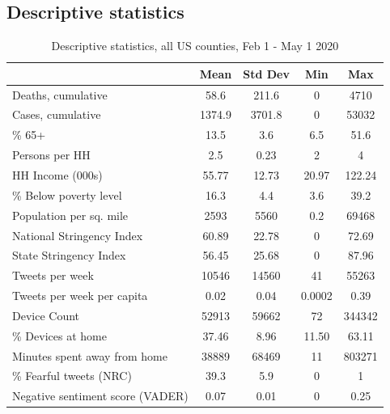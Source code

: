 \documentclass{article}
\begin{document}
\subsection{Descriptive statistics}\label{descrip}
\begin{singlespace}
    \begin{table}[!htb]
    \centering  
  \caption{Descriptive statistics, all US counties, Feb 1 - May 1 2020}
    \begin{tabular}{lcccc}
      \toprule
       & Mean & Std Dev & Min & Max\\
      \midrule
      
      Deaths, cumulative & 58.6 & 211.6 & 0 & 4710\\
      Cases, cumulative & 1374.9 & 3701.8 & 0 & 53032\\
      \midrule
      \% 65+ & 13.5 & 3.6 & 6.5 & 51.6\\
    Persons per HH & 2.5 & 0.23 & 2 & 4\\
    HH Income (000s) & 55.77 & 12.73 & 20.97 & 122.24\\
    \% Below poverty level & 16.3 & 4.4 & 3.6 & 39.2\\
    Population per sq. mile & 2593 & 5560 & 0.2 & 69468\\
    \midrule
    National Stringency Index & 60.89 & 22.78 & 0 & 72.69\\
    State Stringency Index & 56.45 & 25.68 & 0 & 87.96\\
    \midrule
    Tweets per week & 10546 & 14560 & 41 & 55263\\
    Tweets per week per capita & 0.02 & 0.04 & 0.0002 & 0.39\\
    \midrule
    Device Count & 52913 & 59662 & 72 & 344342\\
    \% Devices at home & 37.46 & 8.96 & 11.50 & 63.11\\
    Minutes spent away from home & 38889 & 68469 & 11 & 803271\\
    \midrule
    \% Fearful tweets (NRC) & 39.3 & 5.9 & 0 & 1\\
  
    Negative sentiment score (VADER) & 0.07 & 0.01 & 0 & 0.25\\
  
    \bottomrule
    \end{tabular}
  \end{table}
\end{singlespace}
\end{document}
